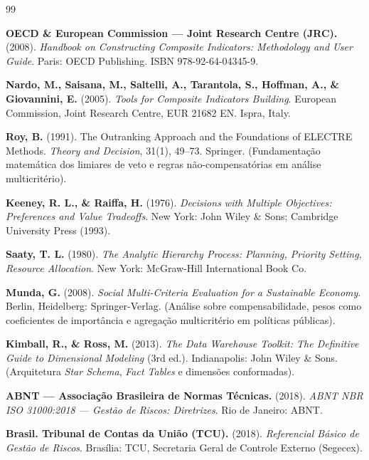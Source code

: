 \documentclass[9pt,a4paper]{extarticle}
\begin{document}
\begin{thebibliography}{99}
\footnotesize

\textbf{OECD \& European Commission --- Joint Research Centre (JRC).} (2008). \emph{Handbook on Constructing Composite Indicators: Methodology and User Guide}. Paris: OECD Publishing. ISBN 978-92-64-04345-9.

\textbf{Nardo, M., Saisana, M., Saltelli, A., Tarantola, S., Hoffman, A., \& Giovannini, E.} (2005). \emph{Tools for Composite Indicators Building}. European Commission, Joint Research Centre, EUR 21682 EN. Ispra, Italy.

\textbf{Roy, B.} (1991). The Outranking Approach and the Foundations of ELECTRE Methods. \emph{Theory and Decision}, 31(1), 49--73. Springer. (Fundamentação matemática dos limiares de veto e regras não-compensatórias em análise multicritério).

\textbf{Keeney, R. L., \& Raiffa, H.} (1976). \emph{Decisions with Multiple Objectives: Preferences and Value Tradeoffs}. New York: John Wiley \& Sons; Cambridge University Press (1993).

\textbf{Saaty, T. L.} (1980). \emph{The Analytic Hierarchy Process: Planning, Priority Setting, Resource Allocation}. New York: McGraw-Hill International Book Co.

\textbf{Munda, G.} (2008). \emph{Social Multi-Criteria Evaluation for a Sustainable Economy}. Berlin, Heidelberg: Springer-Verlag. (Análise sobre compensabilidade, pesos como coeficientes de importância e agregação multicritério em políticas públicas).

\textbf{Kimball, R., \& Ross, M.} (2013). \emph{The Data Warehouse Toolkit: The Definitive Guide to Dimensional Modeling} (3rd ed.). Indianapolis: John Wiley \& Sons. (Arquitetura \emph{Star Schema}, \emph{Fact Tables} e dimensões conformadas).

\textbf{ABNT --- Associação Brasileira de Normas Técnicas.} (2018). \emph{ABNT NBR ISO 31000:2018 --- Gestão de Riscos: Diretrizes}. Rio de Janeiro: ABNT.

\textbf{Brasil. Tribunal de Contas da União (TCU).} (2018). \emph{Referencial Básico de Gestão de Riscos}. Brasília: TCU, Secretaria Geral de Controle Externo (Segecex).


\end{thebibliography}
\end{document}
